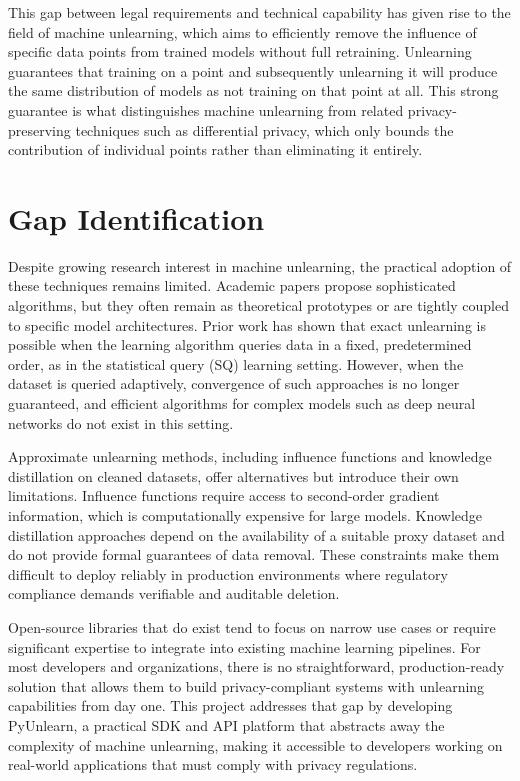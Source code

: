 This gap between legal requirements and technical capability has given rise to the field of machine unlearning, which aims to efficiently remove the influence of specific data points from trained models without full retraining. Unlearning guarantees that training on a point and subsequently unlearning it will produce the same distribution of models as not training on that point at all. This strong guarantee is what distinguishes machine unlearning from related privacy-preserving techniques such as differential privacy, which only bounds the contribution of individual points rather than eliminating it entirely.

\section{Gap Identification}
Despite growing research interest in machine unlearning, the practical adoption of these techniques remains limited. Academic papers propose sophisticated algorithms, but they often remain as theoretical prototypes or are tightly coupled to specific model architectures. Prior work has shown that exact unlearning is possible when the learning algorithm queries data in a fixed, predetermined order, as in the statistical query (SQ) learning setting. However, when the dataset is queried adaptively, convergence of such approaches is no longer guaranteed, and efficient algorithms for complex models such as deep neural networks do not exist in this setting.

Approximate unlearning methods, including influence functions and knowledge distillation on cleaned datasets, offer alternatives but introduce their own limitations. Influence functions require access to second-order gradient information, which is computationally expensive for large models. Knowledge distillation approaches depend on the availability of a suitable proxy dataset and do not provide formal guarantees of data removal. These constraints make them difficult to deploy reliably in production environments where regulatory compliance demands verifiable and auditable deletion.

Open-source libraries that do exist tend to focus on narrow use cases or require significant expertise to integrate into existing machine learning pipelines. For most developers and organizations, there is no straightforward, production-ready solution that allows them to build privacy-compliant systems with unlearning capabilities from day one. This project addresses that gap by developing PyUnlearn, a practical SDK and API platform that abstracts away the complexity of machine unlearning, making it accessible to developers working on real-world applications that must comply with privacy regulations.

